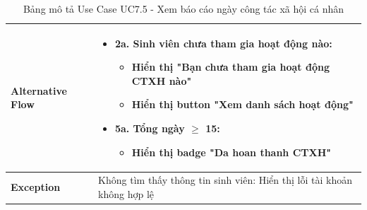 \begin{table}[H]
\begin{tabular}{|m{}|m{}|}
    \textbf{Alternative Flow} 
    & \begin{itemize}
        \item \textbf{2a.} Sinh viên chưa tham gia hoạt động nào:
        \begin{itemize}
            \item Hiển thị "Bạn chưa tham gia hoạt động CTXH nào"
            \item Hiển thị button "Xem danh sách hoạt động"
        \end{itemize}
        \item \textbf{5a.} Tổng ngày $\geq$ 15:
        \begin{itemize}
            \item Hiển thị badge "Da hoan thanh CTXH"
        \end{itemize}
    \end{itemize}
    \\ \hline

    \textbf{Exception} 
    & Không tìm thấy thông tin sinh viên: Hiển thị lỗi tài khoản không hợp lệ
    \\ \hline
    \end{tabular}
    \caption{Bảng mô tả Use Case UC7.5 - Xem báo cáo ngày công tác xã hội cá nhân}
    \end{table}

